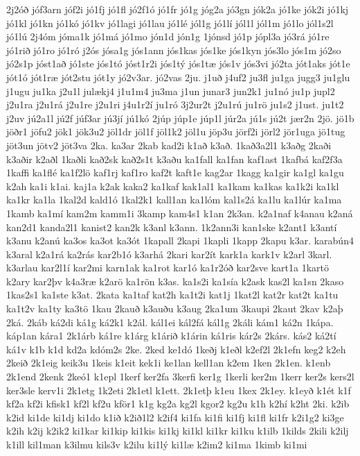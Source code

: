 {2j2óð
jóf3arn
jóf2i
jó1fj
jó1fl
jó2f1ó
jó1fr
jó1g
jóg2a
jó3gn
jók2a
jó1ke
jók2i
jó1kj
jó1kl
jó1kn
jó1kó
jó1kv
jó1lagi
jó1lau
jó1lé
jól1g
jó1lí
jól1l
jól1m
jó1lo
jól1s2l
jó1lú
2j4óm
jóma1k
jó1má
jó1mo
jón1d
jón1g
1jónsd
jó1p
jópl3a
jó3rá
jó1re
jó1rið
jó1ro
jó1ró
j2ós
jósa1g
jós1ann
jós1kas
jós1ke
jós1kyn
jós3lo
jós1m
jó2so
jó2s1p
jóst1að
jó1ste
jós1tó
jóst1r2i
jós1tý
jós1tæ
jós1v
jós3vi
jó2ta
jót1aks
jót1e
jót1ó
jót1ræ
jót2stu
jót1y
jó2v3ar.
jó2vas
2ju.
j1uð
j4uf2
ju3fl
ju1ga
jugg3
ju1glu
j1ugu
ju1ka
j2u1l
julækj4
j1u1m4
ju3ma
j1un
junar3
jun2k1
ju1nó
ju1p
jupl2
j2u1ra
j2u1rá
j2u1re
j2u1ri
j4u1r2í
ju1ró
3j2ur2t
j2u1rú
ju1rö
ju1s2
j1ust.
ju1t2
j2uv
jú2a1l
jú2f
júf3ar
jú3jí
jú1kó
2júp
júp1e
júp1l
júr2a
jú1s
jú2t
jær2n
2jö.
jö1b
jöðr1
jöfu2
jök1
jök3u2
jöl1dr
jöl1f
jöl1k2
jöl1u
jöp3u
jörf2i
jörl2
jör1uga
jö1tug
jöt3un
jötv2
jöt3va
2ka.
ka3ar
2kab
kad2i
k1að
k3að.
1kað3a2l1
k3aðg
2kaði
k3aðir
k2aðl
1kaðli
kað2sk
kað2s1t
k3aðu
ka1fall
ka1fan
kaf1ast
1kafbá
kaf2f3a
1kaffi
ka1flé
ka1f2lö
kaf1rj
kaf1ro
kaf2t
kaft1e
kag2ar
1kagg
ka1gir
ka1gl
ka1gu
k2ah
ka1i
k1ai.
kaj1a
k2ak
kaka2
ka1kaf
kak1al1
ka1kam
ka1kas
ka1k2i
ka1kl
ka1kr
ka1la
1kal2d
kald1ó
1kal2k1
kall1an
ka1lóm
kal1s2á
ka1lu
ka1lúr
ka1ma
1kamb
ka1mí
kam2m
kamm1i
3kamp
kam4s1
k1an
2k3an.
k2a1naf
k4anau
k2aná
kan2d1
kanda2l1
kanist2
kan2k
k3anl
k3ann.
1k2ann3i
kan1ske
k2ant1
k3antí
k3anu
k2anú
ka3os
ka3ot
ka3ót
1kapall
2kapi
1kapli
1kapp
2kapu
k3ar.
karabún4
k3aral
k2a1rá
ka2rás
kar2b1ó
k3arhá
2kari
kar2ít
kark1a
kark1v
k2arl
3karl.
k3arlau
kar2l1í
kar2mi
karn1ak
ka1rot
kar1ó
ka1r2óð
kar2sve
kart1a
1kartö
k2ary
kar2þv
k4a3ræ
k2arö
ka1rön
k3as.
ka1s2i
ka1sía
k2ask
kas2l
ka1sn
2kaso
1kas2s1
ka1ste
k3at.
2kata
ka1taf
kat2h
ka1t2i
kat1j
1kat2l
kat2r
kat2t
ka1tu
ka1t2v
ka1ty
ka3tö
1kau
2kauð
k3auðu
k3aug
2ka1um
3kaupi
2kaut
2kav
k2aþ
2ká.
2káb
ká2di
ká1g
ká2k1
k2ál.
kál1ei
kál2fá
kál1g
2káli
kám1
ká2n
1kápa.
káp1an
kára1
2k1árb
ká1re
k1árg
k1árið
k1árin
ká1ris
kár2s
2kárs.
kás2
ká2tí
ká1v
k1b
k1d
kd2a
kdóm2s
2ke.
2ked
ke1dó
1keðj
k1eðl
k2ef2l
2k1efn
keg2
k2eh
2keið
2k1eig
keik3u
1keis
k1eit
kek1i
ke1lan
kell1an
k2em
1ken
2k1en.
k1enb
2k1end
2kenk
2keó1
k1epl
1kerf
ker2fa
3kerfi
ker1g
1kerli
ker2m
1kerr
ker2s
kers2l
ker3sle
kerv1i
2k1etg
1k2eti
2k1etl
k1ett.
2k1etþ
k1eu
1kex
2k1ey.
k1eyð
k1ét
k1f
kf2a
kf2i
kfisk1
kf2l
kf2u
kför1
k1g
kg2a
kg2l
kgor2
kg2u
k1h
k2hí
k2ht
2ki.
k2ib
k2id
ki1de
ki1dj
ki1do
k1ið
k2ið1l2
k2if4
ki1fa
ki1fi
ki1fj
ki1fl
ki1fr
k2i1g2
ki3ge
k2ih
k2ij
k2ik2
ki1kar
ki1kip
ki1kis
ki1kj
ki1kl
ki1kr
ki1ku
k1ilb
1kilds
2kili
k2ilj
k1ill
kil1man
k3ilmu
kils3v
k2ilu
ki1lý
ki1læ
k2im2
ki1ma
1kimb
ki1mi
}
